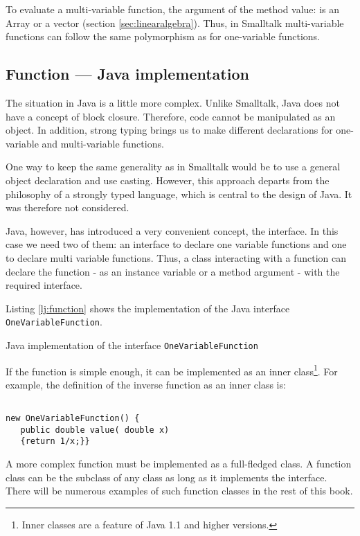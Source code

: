 \documentclass[twoside]{book}
\begin{document}
To evaluate a multi-variable function, the argument of the method
value: is an Array or a vector (\cf section
\ref{sec:linearalgebra}). Thus, in Smalltalk multi-variable
functions can follow the same polymorphism as for one-variable
functions.

\subsection{Function --- Java implementation}
\label{sec:jvFunction} The situation in Java is
a little more complex. Unlike Smalltalk, Java does not have a
concept of block closure. Therefore, code cannot be manipulated as
an object. In addition, strong typing brings us to make different
declarations for one-variable and multi-variable functions.

One way to keep the same generality as in Smalltalk would be to
use a general object declaration and use casting. However, this
approach departs from the philosophy of a strongly typed language,
which is central to the design of Java. It was therefore not
considered.

Java, however, has introduced a very convenient concept, the
interface. In this case we need two of them: an interface to
declare one variable functions and one to declare multi variable
functions. Thus, a class interacting with a function can declare
the function - as an instance variable or a method argument - with
the required interface.

Listing \ref{lj:function} shows the implementation of the Java
interface {\tt OneVariableFunction}.

\begin{listing}
Java implementation of the interface {\tt OneVariableFunction}
\label{lj:function}

\end{listing}

If the function is simple enough, it can be implemented as an
inner class\footnote{Inner classes are a feature of Java 1.1 and
higher versions.}. For example, the definition of the inverse
function as an inner class is:
\begin{codeExample}
\begin{verbatim}

new OneVariableFunction() {
   public double value( double x)
   {return 1/x;}}
\end{verbatim}
\end{codeExample}
A more complex function must be implemented as a full-fledged
class. A function class can be the subclass of any class as long
as it implements the interface. There will be numerous examples of
such function classes in the rest of this book.
\end{document}
